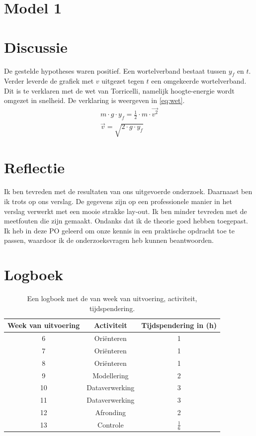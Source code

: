 \documentclass[numbers=endperiod]{scrartcl}
\begin{document}
\section{Model 1}

\section{Discussie}
De gestelde hypotheses waren positief. Een wortelverband bestaat tussen $y_f$ en $t$. Verder leverde de grafiek met $v$ uitgezet tegen $t$ een omgekeerde wortelverband. Dit is te verklaren met de wet van Torricelli, namelijk hoogte-energie wordt omgezet in snelheid. De verklaring is weergeven in \cref{eq:wet}.
\begin{equation}\label{eq:wet}
\begin{split}
m \cdot g \cdot y_f = \frac{1}{2} \cdot m \cdot \vec{v^2}\\
\vec{v} = \sqrt{2 \cdot g \cdot y_f}
\end{split}
\end{equation}

\section{Reflectie}
Ik ben tevreden met de resultaten van ons uitgevoerde onderzoek. Daarnaast
ben ik trots op ons verslag. De gegevens zijn op een professionele
manier in het verslag verwerkt met een mooie strakke lay-out. Ik ben minder
tevreden met de meetfouten die zijn gemaakt. Ondanks dat ik de theorie
goed hebben toegepast. Ik heb in deze PO geleerd om onze kennis in
een praktische opdracht toe te passen, waardoor ik de onderzoeksvragen
heb kunnen beantwoorden.


\newpage
\appendix
\section{Logboek}
\begin{table}[ht]
\centering
\caption{Een logboek met de van week van uitvoering, activiteit, tijdspendering.}
\begin{tabular}{Scc}
\toprule
{Week van uitvoering} & Activiteit & Tijdspendering in (\si{\hour})\\
 & Oriënteren & 1\\
7 & Oriënteren & 1\\
8 & Oriënteren & 1\\
9 & Modellering & 2\\
10 & Dataverwerking & 3\\
11 & Dataverwerking & 3\\
12 & Afronding & 2\\
13 & Controle & $\frac{1}{6}$\\
\bottomrule
\end{tabular}
\end{table}
\end{document}
